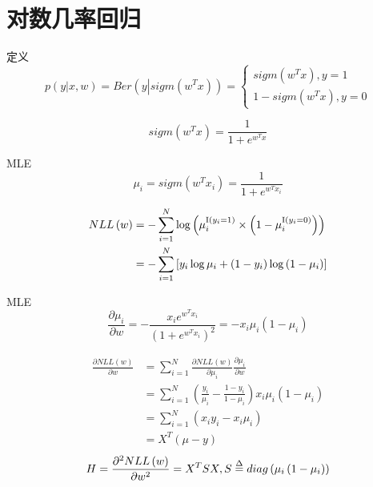 \documentclass[xetex,mathserif,serif]{beamer}
\begin{document}
\section{对数几率回归}
\begin{frame}{定义}
    \[p\left( {y\left| {x,w} \right.} \right) = Ber\left( {y\left| {sigm\left( {{w^T}x} \right)} \right.} \right) = \left\{ {\begin{array}{*{20}{l}}
    {sigm\left( {{w^T}x} \right),y = 1}\\
    {1 - sigm\left( {{w^T}x} \right),y = 0}
    \end{array}} \right.\]

    \[sigm\left( {{w^T}x} \right) = \frac{1}{{1 + {e^{{w^T}x}}}}\]
\end{frame}

\begin{frame}{MLE}
\[{\mu _i} = sigm\left( {{w^T}{x_i}} \right) = \frac{1}{{1 + {e^{{w^T}{x_i}}}}}\]

\begin{equation*}
\begin{aligned} %
    NLL\left( w \right)
     &=  - \sum\limits_{i = 1}^N {\log \left( {\mu _i^{{\rm I}\left( {{y_i} = 1} \right)} \times \left( {1 - \mu _i^{{\rm I}\left( {{y_i} = 0} \right)}} \right)} \right)} \\
     & =  - \sum\limits_{i = 1}^N {\left[ {{y_i}\log {\mu _i} + \left( {1 - {y_i}} \right)\log \left( {1 - {\mu _i}} \right)} \right]}
\end{aligned}
\end{equation*}
\end{frame}

\begin{frame}{MLE}
\[\frac{{\partial {\mu _i}}}{{\partial w}} =  - \frac{{{x_i}{e^{{w^T}{x_i}}}}}{{{{\left( {1 + {e^{{w^T}{x_i}}}} \right)}^2}}} =  - {x_i}{\mu _i}\left( {1 - {\mu _i}} \right)\]

\begin{equation*}
\begin{aligned} %
    \frac{{\partial NLL\left( w \right)}}{{\partial w}}
    & = \sum\limits_{i = 1}^N {\frac{{\partial NLL\left( w \right)}}{{\partial {\mu _i}}}} \frac{{\partial {\mu _i}}}{{\partial w}} \\
    & = \sum\limits_{i = 1}^N {\left( {\frac{{{y_i}}}{{{\mu _i}}} - \frac{{1 - {y_i}}}{{1 - {\mu _i}}}} \right){x_i}} {\mu _i}\left( {1 - {\mu _i}} \right)\\
     &　= \sum\limits_{i = 1}^N {\left( {{x_i}{y_i} - {x_i}{\mu _i}} \right)} \\
     &  = {X^T}\left( {\mu  - y} \right)
\end{aligned}
\end{equation*}
\[H = \frac{{{\partial ^2}NLL\left( w \right)}}{{\partial {w^2}}} = {X^T}SX,S \buildrel \Delta \over = diag\left( {{\mu _i}\left( {1 - {\mu _i}} \right)} \right)\]
\end{frame}
\end{document}
